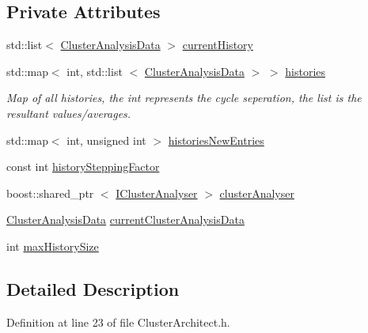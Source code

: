 \subsection*{\-Private \-Attributes}
\begin{DoxyCompactItemize}
\item 
std\-::list$<$ \hyperlink{classcryomesh_1_1manipulators_1_1ClusterAnalysisData}{\-Cluster\-Analysis\-Data} $>$ \hyperlink{classcryomesh_1_1manipulators_1_1ClusterArchitect_a5ab807b2682f56ffd1cfcf8b7b54b2a0}{current\-History}
\item 
std\-::map$<$ int, std\-::list\*
$<$ \hyperlink{classcryomesh_1_1manipulators_1_1ClusterAnalysisData}{\-Cluster\-Analysis\-Data} $>$ $>$ \hyperlink{classcryomesh_1_1manipulators_1_1ClusterArchitect_a8414fe32bad8df5943f91018b9258112}{histories}
\begin{DoxyCompactList}\small\item\em \-Map of all histories, the int represents the cycle seperation, the list is the resultant values/averages. \end{DoxyCompactList}\item 
std\-::map$<$ int, unsigned int $>$ \hyperlink{classcryomesh_1_1manipulators_1_1ClusterArchitect_abaeb85dae0b04e1cec3d988211b5bd91}{histories\-New\-Entries}
\item 
const int \hyperlink{classcryomesh_1_1manipulators_1_1ClusterArchitect_a766f4eb432605c7fff53dae0e8569dd7}{history\-Stepping\-Factor}
\item 
boost\-::shared\-\_\-ptr\*
$<$ \hyperlink{classcryomesh_1_1manipulators_1_1IClusterAnalyser}{\-I\-Cluster\-Analyser} $>$ \hyperlink{classcryomesh_1_1manipulators_1_1ClusterArchitect_a376af658286be49dc6fc5fea9927c7bc}{cluster\-Analyser}
\item 
\hyperlink{classcryomesh_1_1manipulators_1_1ClusterAnalysisData}{\-Cluster\-Analysis\-Data} \hyperlink{classcryomesh_1_1manipulators_1_1ClusterArchitect_a90412a42b771826aa325163eb8dd35ea}{current\-Cluster\-Analysis\-Data}
\item 
int \hyperlink{classcryomesh_1_1manipulators_1_1ClusterArchitect_a2a3b819358a723ce61c58063c6adff7f}{max\-History\-Size}
\end{DoxyCompactItemize}


\subsection{\-Detailed \-Description}


\-Definition at line 23 of file \-Cluster\-Architect.\-h.



